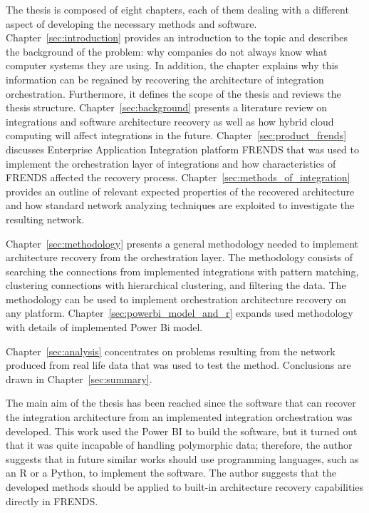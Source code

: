 \documentclass[english, 12pt, a4paper, sci, utf8, a-2b, online, obeyspaces]{aaltothesis}
\begin{document}
The thesis is composed of eight chapters, each of them dealing with a different aspect of developing the necessary methods and software. Chapter~\ref{sec:introduction} provides an introduction to the topic and describes the background of the problem: why companies do not always know what computer systems they are using. In addition, the chapter explains why this information can be regained by recovering the architecture of integration orchestration. Furthermore, it defines the scope of the thesis and reviews the thesis structure. Chapter~\ref{sec:background} presents a literature review on integrations and software architecture recovery as well as how hybrid cloud computing will affect integrations in the future. Chapter~\ref{sec:product_frends} discusses Enterprise Application Integration platform FRENDS that was used to implement the orchestration layer of integrations and how characteristics of FRENDS affected the recovery process. Chapter~\ref{sec:methods_of_integration} provides an outline of relevant expected properties of the recovered architecture and how standard network analyzing techniques are exploited to investigate the resulting network.

Chapter~\ref{sec:methodology} presents a general methodology needed to implement architecture recovery from the orchestration layer. The methodology consists of searching the connections from implemented integrations with pattern matching, clustering connections with hierarchical clustering, and filtering the data. The methodology can be used to implement orchestration architecture recovery on any platform. Chapter~\ref{sec:powerbi_model_and_r} expands used methodology with details of implemented Power Bi model.

Chapter~\ref{sec:analysis} concentrates on problems resulting from the network produced from real life data that was used to test the method. Conclusions are drawn in Chapter~\ref{sec:summary}.

The main aim of the thesis has been reached since the software that can recover the integration architecture from an implemented integration orchestration was developed. This work used the Power BI to build the software, but it turned out that it was quite incapable of handling polymorphic data; therefore, the author suggests that in future similar works should use programming languages, such as an R or a Python, to implement the software. The author suggests that the developed methods should be applied to built-in architecture recovery capabilities directly in FRENDS.

\clearpage

\printbibliography
\end{document}

